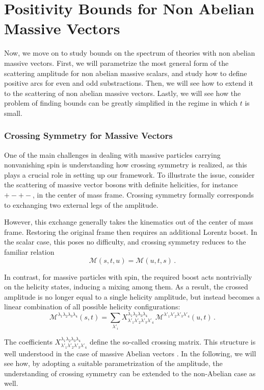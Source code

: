 \chapter{Positivity Bounds for Non Abelian Massive Vectors}
\label{chap:nonab}
Now, we move on to study bounds on the spectrum of theories with non abelian massive vectors. First, we will parametrize the most general form of the scattering amplitude for non abelian massive scalars, and study how to define positive arcs for even and odd substractions.
Then, we will see how to extend it to the scattering of non abelian massive vectors. Lastly, we will see how the problem of finding bounds can be greatly simplified in the regime in which $t$ is small. 

\subsection{Crossing Symmetry for Massive Vectors}
One of the main challenges in dealing with massive particles carrying nonvanishing spin is understanding how crossing symmetry is realized, as this plays a crucial role in setting up our framework. To illustrate the issue, consider the scattering of massive vector bosons with definite helicities, for instance \( + - + - \), in the center of mass frame. Crossing symmetry formally corresponds to exchanging two external legs of the amplitude. 

However, this exchange generally takes the kinematics out of the center of mass frame. Restoring the original frame then requires an additional Lorentz boost. In the scalar case, this poses no difficulty, and crossing symmetry reduces to the familiar relation
\[
\mathcal{M}(s,t,u) = \mathcal{M}(u,t,s)\,.
\]

In contrast, for massive particles with spin, the required boost acts nontrivially on the helicity states, inducing a mixing among them. As a result, the crossed amplitude is no longer equal to a single helicity amplitude, but instead becomes a linear combination of all possible helicity configurations:
\[
\mathcal{M}^{\lambda_1 \lambda_2 \lambda_3 \lambda_4}(s,t)
=
\sum_{\lambda'_i}
X^{\lambda_1 \lambda_2 \lambda_3 \lambda_4}_{\lambda'_1 \lambda'_2 \lambda'_3 \lambda'_4}
\,
\mathcal{M}^{\lambda'_1 \lambda'_2 \lambda'_3 \lambda'_4}(u,t)\,.
\]

The coefficients 
\(X^{\lambda_1 \lambda_2 \lambda_3 \lambda_4}_{\lambda'_1 \lambda'_2 \lambda'_3 \lambda'_4}\) define the so-called crossing matrix. This structure is well understood in the case of massive Abelian vectors \autocite{Bertucci:2024qzt}. In the following, we will see how, by adopting a suitable parametrization of the amplitude, the understanding of crossing symmetry can be extended to the non-Abelian case as well.

